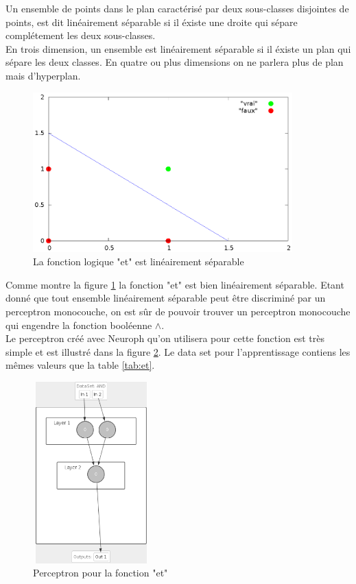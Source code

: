 \documentclass[twoside,openright,a4paper,11pt,french]{article}
\begin{document}
Un ensemble de points dans le plan caractérisé par deux sous-classes disjointes
de points, est dit linéairement séparable si il éxiste une droite qui sépare
complétement les deux sous-classes.\\

En trois dimension, un ensemble est linéairement séparable si il éxiste un plan
qui sépare les deux classes. En quatre ou plus dimensions on ne parlera plus de
plan mais d'hyperplan.


\begin{figure}[ht]
\centering
\includegraphics[width=10cm]{./pics/and/and.eps}
\caption{La fonction logique "et" est linéairement séparable}
\label{fig:and}
\end{figure}


Comme montre la figure \ref{fig:and} la fonction "et" est bien linéairement
séparable. Etant donné que tout ensemble linéairement séparable peut être
discriminé par un perceptron monocouche, on est sûr de pouvoir trouver un perceptron monocouche qui
engendre la fonction booléenne $\land$.\\

Le perceptron créé avec Neuroph qu'on utilisera pour cette fonction 
est très simple et est illustré dans la figure \ref{fig:per_and}.
Le data set pour l'apprentissage contiens les mêmes valeurs que la table
\ref{tab:et}.

\begin{figure}[ht]
\centering
\includegraphics[width=4.5cm,height=7cm]{./pics/perc_and.eps}
\caption{Perceptron pour la fonction "et"}
\label{fig:per_and}
\end{figure}
\end{document}
